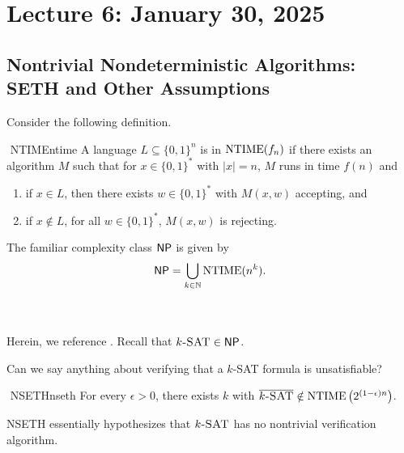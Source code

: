         
\section{Lecture 6: January 30, 2025}

    \subsection{Nontrivial Nondeterministic Algorithms: SETH and Other Assumptions}

        Consider the following definition.
        \begin{definition}{\Stop\,\,NTIME}{ntime}
            A language \(L\subseteq\{0,1\}^n\) is in \(\operatorname{NTIME}(f_n)\) if there exists an algorithm \(M\) such that for \(x\in\{0,1\}^*\) with \(|x|=n\), \(M\) runs in time \(f(n)\) and
            \begin{enumerate}
                \item if \(x\in L\), then there exists \(w\in\{0,1\}^*\) with \(M(x,w)\) accepting, and
                \item if \(x\nin L\), for all \(w\in\{0,1\}^*\), \(M(x,w)\) is rejecting.
            \end{enumerate}
        \end{definition}
        \begin{remark*}
            The familiar complexity class \(\mathsf{NP}\) is given by
            \begin{equation*}
                \mathsf{NP}=\bigcup_{k\in\mathbb{N}}\operatorname{NTIME}(n^k).
            \end{equation*}
        \end{remark*}
        \vphantom
        \\
        \\
        Herein, we reference \cite{carmosino2016nseth}. Recall that \(k\textsc{-SAT}\in\mathsf{NP}\).
        \begin{question*}
            Can we say anything about verifying that a \(k\)\textsc{-SAT} formula is unsatisfiable?
        \end{question*}
        \begin{hypothesis}{\Stop\,\,NSETH}{nseth}
            For every \(\epsilon>0\), there exists \(k\) with \(\overline{k\textsc{-SAT}}\notin\operatorname{NTIME}\left(2^{(1-\epsilon)n}\right)\).
        \end{hypothesis}
        \begin{remark*}
            NSETH essentially hypothesizes that \(k\textsc{-SAT}\) has no nontrivial verification algorithm.
        \end{remark*} 
